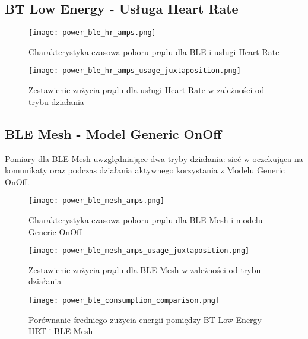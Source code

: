 \subsection{BT Low Energy - Usługa Heart Rate}

\lipsum[1-3]
\begin{figure}[!htb]
	\centering \texttt{[image: power\_ble\_hr\_amps.png]}
	\caption{Charakterystyka czasowa poboru prądu dla BLE i usługi Heart Rate}
	\label{rys:power_ble_hr_amps}
\end{figure}

\lipsum[1-2]
\begin{figure}[!htb]
	\centering \texttt{[image: power\_ble\_hr\_amps\_usage\_juxtaposition.png]}
	\caption{Zestawienie zużycia prądu dla usługi Heart Rate w zależności od trybu działania}
	\label{rys:power_ble_hr_amps_usage_juxtaposition}
\end{figure}
\lipsum[1-3]

\subsection{BLE Mesh - Model Generic OnOff}

Pomiary dla BLE Mesh uwzględniające dwa tryby działania: sieć w oczekująca na komunikaty oraz podczas działania aktywnego korzystania z Modelu Generic OnOff.

\begin{figure}[!htb]
	\centering \texttt{[image: power\_ble\_mesh\_amps.png]} 
	\caption{Charakterystyka czasowa poboru prądu dla BLE Mesh i modelu Generic OnOff}
	\label{rys:power_ble_mesh_amps}
\end{figure}

\lipsum[1-3]
\begin{figure}[!htb]
	\centering \texttt{[image: power\_ble\_mesh\_amps\_usage\_juxtaposition.png]} 
	\caption{Zestawienie zużycia prądu dla BLE Mesh w zależności od trybu działania}
	\label{rys:power_ble_mesh_amps_usage_juxtaposition}
\end{figure}

\lipsum[1-3]
\begin{figure}[!htb]
	\centering \texttt{[image: power\_ble\_consumption\_comparison.png]} 
	\caption{Porównanie średniego zużycia energii pomiędzy BT Low Energy HRT i BLE Mesh}
	\label{rys:power_ble_consumption_comparison}
\end{figure}




